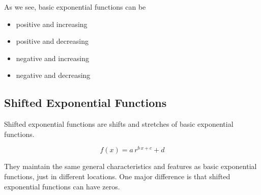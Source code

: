 \documentclass{ximera}
\begin{document}
As we see, basic exponential functions can be

\begin{itemize}
\item positive and increasing
\item positive and decreasing
\item negative and increasing
\item negative and decreasing
\end{itemize}

















\subsection{Shifted Exponential Functions}


Shifted exponential functions are shifts and stretches of basic exponential functions.  


\[
f(x) = a \, r^{b \, x + c} + d
\]



They maintain the same general characteristics and features as basic exponential functions, just in different locations. One major difference is that shifted exponential functions can have zeros.
\end{document}
